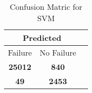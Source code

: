 \begin{table}[] 
\caption{Confusion Matric for SVM} 
\label{Table: Prediction Accuracy-NoneSVM99.0EKF-ignoreReflection-Reflection} 
\centering 
\begin{tabular} 
 {@{}ccc@{}} 
\toprule 
\multicolumn{2}{c}{\textbf{Predicted}}
 \\ \midrule 
\multicolumn{1}{|c|}{Failure} & 
\multicolumn{1}{c|}{No Failure}
 \\ \midrule 
\multicolumn{1}{|c|}{\color{green}\textbf{25012}} & 
\multicolumn{1}{c|}{\color{red}\textbf{840}}
 \\ \midrule 
\multicolumn{1}{|c|}{\color{red}\textbf{49}} & 
\multicolumn{1}{c|}{\color{green}\textbf{2453}}
 \\ \bottomrule 
\end{tabular} 
\end{table} 
